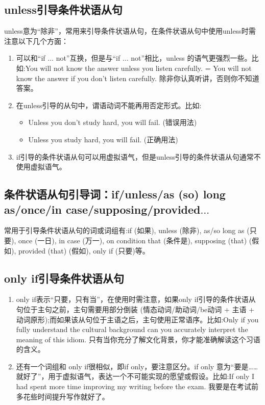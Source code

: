 \subsection{unless引导条件状语从句}

unless意为“除非”，常用来引导条件状语从句，在条件状语从句中使用unless时需注意以下几个方面：
\begin{enumerate}
  \item 可以和“if \(\ldots\) not”互换，但是与“if \(\ldots\) not”相比，unless 的语气更强烈一些。比如:You will not know the answer unless you listen carefully. = You will not know the answer if you don't listen carefully. 除非你认真听讲，否则你不知道答案。
  \item 在unless引导的从句中，谓语动词不能再用否定形式。比如:
        \begin{itemize}
          \item Unless you don't study hard, you will fail. (错误用法)
          \item Unless you study hard, you will fail. (正确用法)
        \end{itemize}
  \item if引导的条件状语从句可以用虚拟语气，但是unless引导的条件状语从句通常不使用虚拟语气。
\end{enumerate}

\subsection{条件状语从句引导词：if/unless/as (so) long as/once/in case/supposing/provided\(\ldots\)}

常用于引导条件状语从句的词或词组有:if (如果), unless (除非), as/so long as (只要), once (一日), in case (万一), on condition that (条件是), supposing (that) (假如), provided (that) (假如), only if (只要)等。

\subsection{only if引导条件状语从句}

\begin{enumerate}
  \item only if表示“只要，只有当”，在使用时需注意，如果only if引导的条件状语从句位于主句之前，主句需要用部分倒装 (情态动词/助动词/be动词 + 主语 + 动词原形);而如果该从句位于主语之后，主句使用正常语序。比如:Only if you fully understand the cultural background can you accurately interpret the meaning of this idiom. 只有当你充分了解文化背景，你才能准确解读这个习语的含义。
  \item 还有一个词组和 only if很相似，即if only，要注意区分。if only 意为“要是……就好了”，用于虚拟语气，表达一个不可能实现的愿望或假设。比如:If only I had spent more time improving my writing before the exam. 我要是在考试前多花些时间提升写作就好了。
\end{enumerate}

